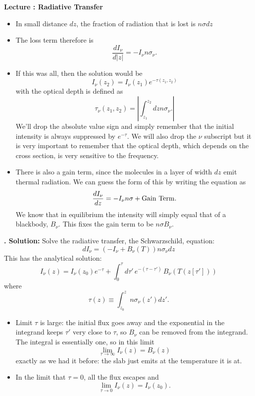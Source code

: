 \documentclass[11pt]{book}
\def\be{\begin{equation}}
\def\ee{\end{equation}}
\newcommand{\eql}[1]{\label{eq:#1}}
\newcommand\bei{\begin{itemize}}
\newcommand\eei{\end{itemize}}
\newcommand\lecture[1]{\newpage
\addtocounter{lectureno}{1}
\setcounter{secno}{0}
\begin{center}
 {\bf Lecture \arabic{lectureno}: #1}
\end{center}
}
\newcounter{lectureno}
\newcounter{secno}
\newcommand\lsection[1]{
\addtocounter{secno}{1}
{\bf \arabic{lectureno}.\alph{secno} #1:}}
\begin{document}
\lecture{Radiative Transfer}
 \bei
 \item In small distance $dz$, the fraction of radiation that is lost is $n\sigma dz$
 \item The loss term therefore is 
 \be
 \frac{dI_\nu}{d|z|} = -I_\nu n\sigma_\nu .\ee
 \item If this was all, then the solution would be 
 \be
 I_\nu(z_2) = I_\nu(z_1) e^{-\tau(z_1,z_2)} \ee
 with
the optical depth is defined as
 \be
 \tau_\nu(z_1,z_2) = \left\vert  \int_{z_1}^{z_2} dz n\sigma_\nu. \right\vert\ee
 We'll drop the absolute value sign and simply remember that the initial intensity is always suppressed by $e^{-\tau}$. We will also drop the $\nu$ subscript but it is very important to remember that the optical depth, which depends on the cross section, is very sensitive to the frequency.
 \item There is also a gain term, since the molecules in a layer of width $dz$ emit thermal radiation. We can guess the form of this by writing the equation as
 \be
 \frac{dI_\nu}{dz} = -I_\nu n \sigma + {\rm Gain\ Term}.
 \ee
 We know that in equilibrium the intensity will simply equal that of a blackbody, $B_\nu$. This fixes the gain term to be $n \sigma B_\nu$.
\eei
 
 


 
\lsection{Solution} Solve the radiative transfer, the Schwarzschild, equation:
$$ dI_\nu = (-I_\nu + B_\nu(T)) n\sigma_\nu dz $$
This has the analytical solution:
$$ I_\nu(z) = I_\nu(z_0) e^{-\tau} + \int_{0}^\tau d\tau'\,e^{-(\tau-\tau')}\, B_\nu\left(T(z[\tau'])\right)$$
where $$\tau(z)\equiv \int_{z_0}^z  n\sigma_\nu(z') dz'.\eql{rtan}$$
\bei
\item Limit $\tau$ is large: the initial flux goes away and the exponential in the integrand keeps $\tau'$ very close to $\tau$, so $B_\nu$ can be removed from the integrand. The integral is essentially one, so in this limit
\be
\lim_{\tau\rightarrow\infty} I_\nu(z) = B_\nu(z)
\ee
exactly as we had it before: the slab just emits at the temperature it is at.
\item In the limit that $\tau=0$, all the flux escapes and 
\be
\lim_{\tau\rightarrow 0} I_\nu(z) = I_\nu(z_0)
.\ee
\eei
\end{document}

